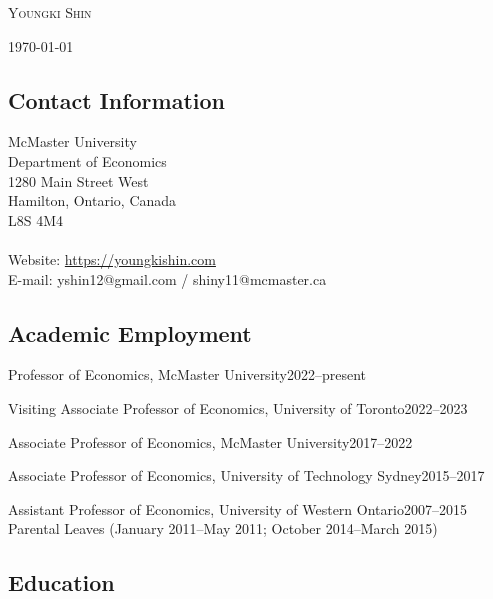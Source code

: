 \documentclass[12pt]{article}
\begin{document}
\begin{center}
\thispagestyle{empty}
{\LARGE \textsc{Youngki Shin}}

\bigskip
\today
\end{center}
\vskip20pt

\subsection*{Contact Information}

McMaster University\\
Department of Economics\\
1280 Main Street West\\
Hamilton, Ontario, Canada\\
L8S 4M4\\
\\
Website: \url{https://youngkishin.com}\\
E-mail: {yshin12@gmail.com} / {shiny11@mcmaster.ca}


\subsection*{{Academic Employment}}

\begin{description}
\item \hspace{0.2in}Professor of Economics, McMaster University\hfill 2022--present\\
\item \hspace{0.2in}Visiting Associate Professor of Economics, University of Toronto\hfill 2022--2023
\item \hspace{0.2in}Associate Professor of Economics, McMaster University\hfill 2017--2022
\item \hspace{0.2in}Associate Professor of Economics, University of Technology Sydney\hfill 2015--2017
\item \hspace{0.2in}Assistant Professor of Economics, University of Western
Ontario\hfill  2007--2015\\
\hspace{0.4in}Parental Leaves (January 2011--May 2011; October 2014--March 2015)
\end{description}

\subsection*{Education}
\end{document}
